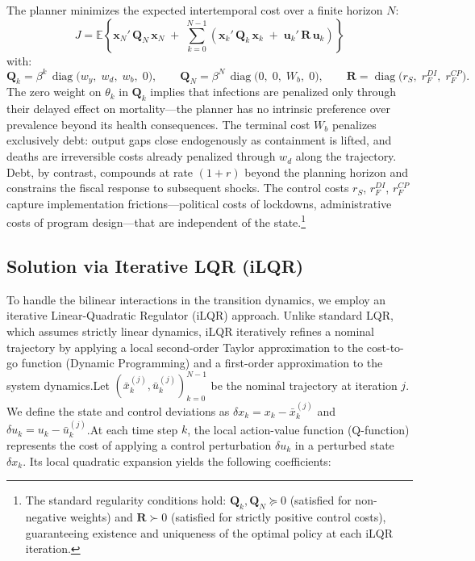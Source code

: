 \documentclass[12pt, a4paper]{article}
\begin{document}
The planner minimizes the expected intertemporal cost over a finite horizon $N$:
%
\begin{equation}
    J = \mathbb{E}\left\{\bm{x}_N'\,\bm{Q}_N\,\bm{x}_N
    \;+\; \sum_{k=0}^{N-1}\left(\bm{x}_k'\,\bm{Q}_k\,\bm{x}_k
    \;+\; \bm{u}_k'\,\bm{R}\,\bm{u}_k\right)\right\}
    \label{eq:objective}
\end{equation}
%
with:
%
\begin{equation}
    \bm{Q}_k = \beta^k\,\operatorname{diag}\bigl(w_y,\; w_d,\; w_b,\; 0\bigr),
    \qquad
    \bm{Q}_N = \beta^N\,\operatorname{diag}\bigl(0,\; 0,\; W_b,\; 0\bigr),
    \qquad
    \bm{R} = \operatorname{diag}\bigl(r_S,\; r_F^{DI},\; r_F^{CP}\bigr).
    \label{eq:weights}
\end{equation}
%
The zero weight on $\theta_k$ in $\bm{Q}_k$ implies that infections are penalized
only through their delayed effect on mortality---the planner has no intrinsic
preference over prevalence beyond its health consequences. The terminal cost $W_b$
penalizes exclusively debt: output gaps close endogenously as containment is lifted,
and deaths are irreversible costs already penalized through $w_d$ along the trajectory.
Debt, by contrast, compounds at rate $(1+r)$ beyond the planning horizon and constrains
the fiscal response to subsequent shocks. The control costs $r_S$, $r_F^{DI}$,
$r_F^{CP}$ capture implementation frictions---political costs of lockdowns,
administrative costs of program design---that are independent of the
state.\footnote{The standard regularity conditions hold: $\bm{Q}_k, \bm{Q}_N \succeq
0$ (satisfied for non-negative weights) and $\bm{R} \succ 0$ (satisfied for strictly
positive control costs), guaranteeing existence and uniqueness of the optimal policy at each iLQR iteration.}


\subsection{Solution via Iterative LQR (iLQR)}

To handle the bilinear interactions in the transition dynamics, we employ an iterative Linear-Quadratic Regulator (iLQR) approach. Unlike standard LQR, which assumes strictly linear dynamics, iLQR iteratively refines a nominal trajectory by applying a local second-order Taylor approximation to the cost-to-go function (Dynamic Programming) and a first-order approximation to the system dynamics.Let $(\bar{x}_k^{(j)}, \bar{u}_k^{(j)})_{k=0}^{N-1}$ be the nominal trajectory at iteration $j$. We define the state and control deviations as $\delta x_k = x_k - \bar{x}_k^{(j)}$ and $\delta u_k = u_k - \bar{u}_k^{(j)}$.At each time step $k$, the local action-value function (Q-function) represents the cost of applying a control perturbation $\delta u_k$ in a perturbed state $\delta x_k$. Its local quadratic expansion yields the following coefficients:
\end{document}
